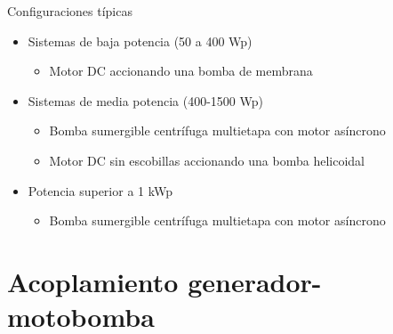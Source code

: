 \documentclass[xcolor={usenames,svgnames,dvipsnames}]{beamer}
\begin{document}
\begin{frame}[label={sec:org52f9532}]{Configuraciones típicas}
\begin{itemize}
\item \alert{Sistemas de baja potencia (50 a 400 Wp)}

\begin{itemize}
\item Motor DC accionando una bomba de membrana
\end{itemize}

\item \alert{Sistemas de media potencia (400-1500 Wp)}

\begin{itemize}
\item Bomba sumergible centrífuga multietapa con motor asíncrono

\item Motor DC sin escobillas accionando una bomba helicoidal
\end{itemize}

\item \alert{Potencia superior a 1 kWp}

\begin{itemize}
\item Bomba sumergible centrífuga multietapa con motor asíncrono
\end{itemize}
\end{itemize}
\end{frame}
\section{Acoplamiento generador-motobomba}
\label{sec:org8da5f97}
\end{document}
